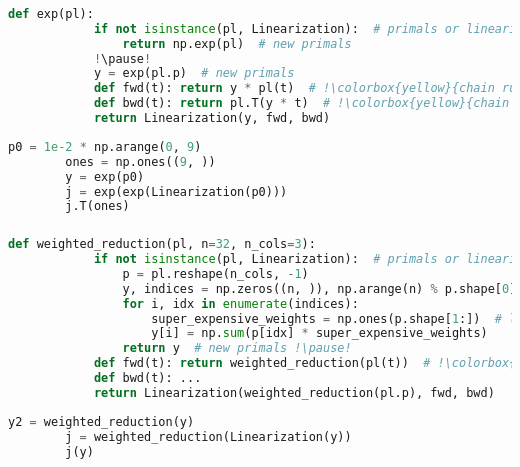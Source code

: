 \documentclass[aspectratio=169,xcolor=dvipsnames]{beamer}
\begin{document}
\begin{frame}[fragile]
	\frametitle{\insertsection}
	\framesubtitle{\insertsubsection}

	\begin{lstlisting}[language=python,escapechar=!]
		def exp(pl):
			if not isinstance(pl, Linearization):  # primals or linearization
				return np.exp(pl)  # new primals
			!\pause!
			y = exp(pl.p)  # new primals
			def fwd(t): return y * pl(t)  # !\colorbox{yellow}{chain rule: $J_{\exp,\mathrm{pl.p}} \cdot J_\mathrm{pl} \cdot t$}!
			def bwd(t): return pl.T(y * t)  # !\colorbox{yellow}{chain rule: $J^\dagger_\mathrm{pl} \cdot J^\dagger_{\exp,\mathrm{pl.p}} \cdot t$}!
			return Linearization(y, fwd, bwd)
	\end{lstlisting}

	\pause
	\begin{lstlisting}[language=python,escapechar=!]
		p0 = 1e-2 * np.arange(0, 9)
		ones = np.ones((9, ))
		y = exp(p0)
		j = exp(exp(Linearization(p0)))
		j.T(ones)
	\end{lstlisting}

\end{frame}

\begin{frame}[fragile]
	\frametitle{\insertsection}
	\framesubtitle{\insertsubsection}

	\begin{lstlisting}[language=python,escapechar=!]
		def weighted_reduction(pl, n=32, n_cols=3):
			if not isinstance(pl, Linearization):  # primals or linearization
				p = pl.reshape(n_cols, -1)
				y, indices = np.zeros((n, )), np.arange(n) % p.shape[0]
				for i, idx in enumerate(indices):
					super_expensive_weights = np.ones(p.shape[1:])  # large weights
					y[i] = np.sum(p[idx] * super_expensive_weights)
				return y  # new primals !\pause!
			def fwd(t): return weighted_reduction(pl(t))  # !\colorbox{yellow}{ref. to self}!
			def bwd(t): ...
			return Linearization(weighted_reduction(pl.p), fwd, bwd)
	\end{lstlisting}

	\pause
	\begin{lstlisting}[language=python,escapechar=!]
		y2 = weighted_reduction(y)
		j = weighted_reduction(Linearization(y))
		j(y)
	\end{lstlisting}

\end{frame}
\end{document}
